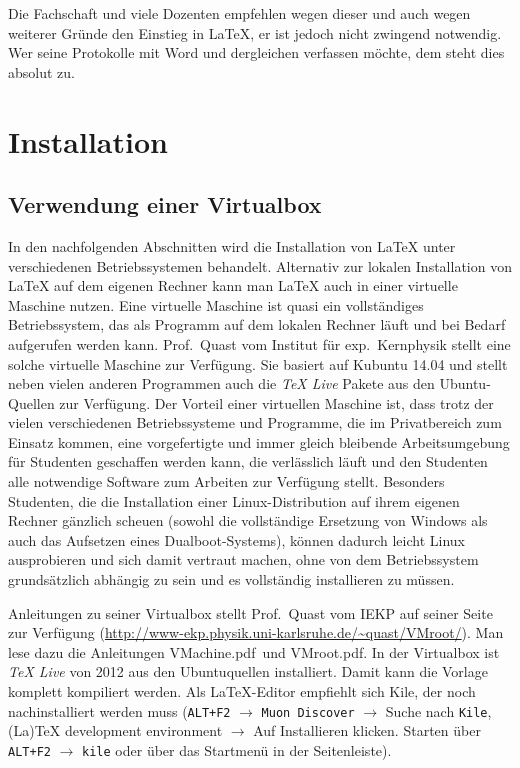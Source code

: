 Die Fachschaft und viele Dozenten empfehlen wegen dieser und auch wegen weiterer Gründe den Einstieg in LaTeX, er ist jedoch nicht zwingend notwendig. Wer seine Protokolle mit Word und dergleichen verfassen möchte, dem steht dies absolut zu.

\section{Installation}
\subsection{Verwendung einer Virtualbox}
In den nachfolgenden Abschnitten wird die Installation von LaTeX unter verschiedenen Betriebssystemen behandelt. Alternativ zur lokalen Installation von LaTeX auf dem eigenen Rechner kann man LaTeX auch in einer virtuelle Maschine nutzen. Eine virtuelle Maschine ist quasi ein vollständiges Betriebssystem, das als Programm auf dem lokalen Rechner läuft und bei Bedarf aufgerufen werden kann. Prof.~Quast vom Institut für exp.~Kernphysik stellt eine solche virtuelle Maschine zur Verfügung. Sie basiert auf Kubuntu 14.04 und stellt neben vielen anderen Programmen auch die \textit{TeX Live} Pakete aus den Ubuntu-Quellen zur Verfügung. Der Vorteil einer virtuellen Maschine ist, dass trotz der vielen verschiedenen Betriebssysteme und Programme, die im Privatbereich zum Einsatz kommen, eine vorgefertigte und immer gleich bleibende Arbeitsumgebung für Studenten geschaffen werden kann, die verlässlich läuft und den Studenten alle notwendige Software zum Arbeiten zur Verfügung stellt. Besonders Studenten, die die Installation einer Linux-Distribution auf ihrem eigenen Rechner gänzlich scheuen (sowohl die vollständige Ersetzung von Windows als auch das Aufsetzen eines Dualboot-Systems), können dadurch leicht Linux ausprobieren und sich damit vertraut machen, ohne von dem Betriebssystem grundsätzlich abhängig zu sein und es vollständig installieren zu müssen.

Anleitungen zu seiner Virtualbox stellt Prof.~Quast vom IEKP auf seiner Seite zur Verfügung (\url{http://www-ekp.physik.uni-karlsruhe.de/~quast/VMroot/}). Man lese dazu die Anleitungen \glqq VMachine.pdf\grqq\ und \glqq VMroot.pdf\grqq. In der Virtualbox ist \textit{TeX Live} von 2012 aus den Ubuntuquellen installiert. Damit kann die Vorlage komplett kompiliert werden. Als LaTeX-Editor empfiehlt sich Kile, der noch nachinstalliert werden muss (\verb|ALT+F2| $\rightarrow$ \verb|Muon Discover| $\rightarrow$ Suche nach \verb|Kile|, (La)TeX development environment $\rightarrow$ Auf Installieren klicken. Starten über \verb|ALT+F2| $\rightarrow$ \verb|kile| oder über das Startmenü in der Seitenleiste).

